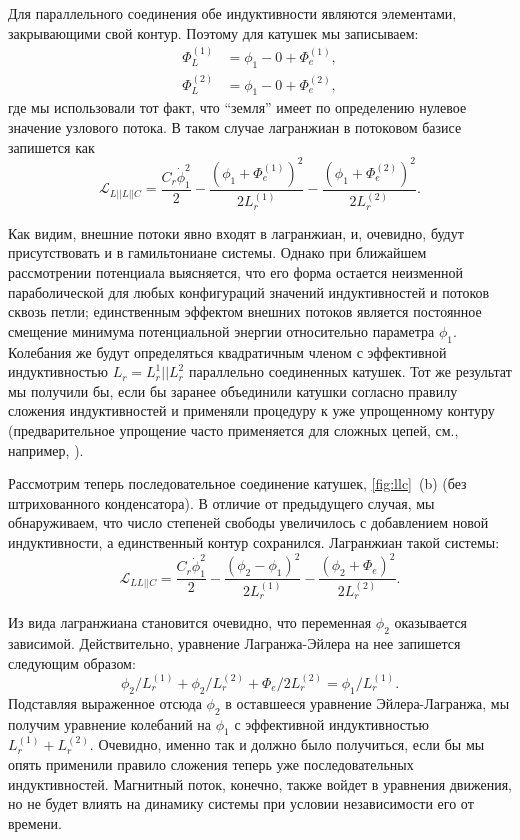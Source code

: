 \documentclass[14pt, a4paper]{extreport}
\numberwithin{equation}{section}
\begin{document}
Для параллельного соединения обе индуктивности являются элементами, закрывающими свой контур. Поэтому для катушек мы записываем:
\begin{align}
	\Phi_L^{(1)} &= \phi_1 - 0 + \Phi_e^{(1)},\\
	\Phi_L^{(2)} &= \phi_1 - 0 + \Phi_e^{(2)},
\end{align}
где мы использовали тот факт, что ``земля'' имеет по определению нулевое значение узлового потока. В таком случае лагранжиан в потоковом базисе запишется как 
\begin{equation}
	\mathcal{L}_{L||L||C} = \frac{C_r \dot\phi_1^2}{2} - \frac{\left(\phi_1 + \Phi_e^{(1)}\right)^2}{2L_r^{(1)}} - \frac{\left(\phi_1 + \Phi_e^{(2)}\right)^2}{2 L_r^{(2)}}.
\end{equation}

Как видим, внешние потоки явно входят в лагранжиан, и, очевидно, будут присутствовать и в гамильтониане системы. Однако при ближайшем рассмотрении потенциала выясняется, что его форма остается неизменной параболической для любых конфигураций значений индуктивностей и потоков сквозь петли; единственным эффектом внешних потоков является постоянное смещение минимума потенциальной энергии относительно параметра $\phi_1$. Колебания же будут определяться квадратичным членом с эффективной индуктивностью $L_r = L_r^1 || L_r^2$ параллельно соединенных катушек. Тот же результат мы получили бы, если бы заранее объединили катушки согласно правилу сложения индуктивностей и применяли процедуру к уже упрощенному контуру (предварительное упрощение часто применяется для сложных цепей, см., например, \cite{koch2007charge}). 

Рассмотрим теперь последовательное соединение катушек, \autoref{fig:llc}~(b) (без штрихованного конденсатора). В отличие от предыдущего случая, мы обнаруживаем, что число степеней свободы увеличилось с добавлением новой индуктивности, а единственный контур сохранился. Лагранжиан такой системы:
\begin{equation}
	\mathcal{L}_{LL||C} = \frac{C_r \dot\phi_1^2}{2} - \frac{(\phi_2 - \phi_1)^2}{2L_r^{(1)}} - \frac{\left(\phi_2+\Phi_e\right)^2}{2 L_r^{(2)}}.\label{eq:ll||c}
\end{equation}

Из вида лагранжиана становится очевидно, что переменная $\phi_2$ оказывается зависимой. Действительно, уравнение Лагранжа-Эйлера на нее запишется следующим образом:
\begin{equation}
	\phi_2/L_r^{(1)} + \phi_2/L_r^{(2)} + \Phi_e/2L_r^{(2)} = \phi_1/L_r^{(1)}.
\end{equation}
Подставляя выраженное отсюда $\phi_2$ в оставшееся уравнение Эйлера-Лагранжа, мы получим уравнение колебаний на $\phi_1$ с эффективной индуктивностью $L_r^{(1)} + L_r^{(2)}$. Очевидно, именно так и должно было получиться, если бы мы опять применили правило сложения теперь уже последовательных индуктивностей. Магнитный поток, конечно, также войдет в уравнения движения, но не будет влиять на динамику системы при условии независимости его от времени. 
\end{document}
